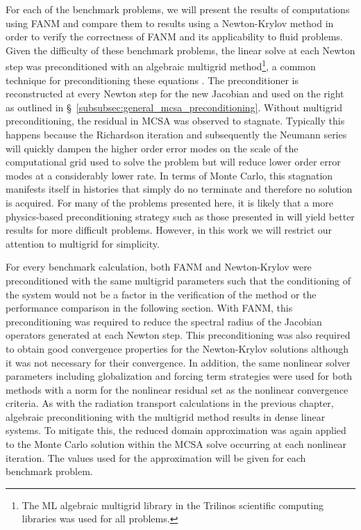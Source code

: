 For each of the benchmark problems, we will present the results of
computations using FANM and compare them to results using a
Newton-Krylov method in order to verify the correctness of FANM and
its applicability to fluid problems. Given the difficulty of these
benchmark problems, the linear solve at each Newton step was
preconditioned with an algebraic multigrid method\footnote{The ML
  algebraic multigrid library in the Trilinos scientific computing
  libraries \cite{heroux_overview_2005} was used for all problems.}, a
common technique for preconditioning these equations
\cite{ghia_high-re_1982,evans_enhanced_2007}. The preconditioner is
reconstructed at every Newton step for the new Jacobian and used on
the right as outlined in
\S~\ref{subsubsec:general_mcsa_preconditioning}. Without multigrid
preconditioning, the residual in MCSA was observed to
stagnate. Typically this happens because the Richardson iteration and
subsequently the Neumann series will quickly dampen the higher order
error modes on the scale of the computational grid used to solve the
problem but will reduce lower order error modes at a considerably
lower rate. In terms of Monte Carlo, this stagnation manifests itself
in histories that simply do no terminate and therefore no solution is
acquired. For many of the problems presented here, it is likely that a
more physics-based preconditioning strategy such as those presented in
\cite{evans_development_2006,evans_enhanced_2007} will yield better
results for more difficult problems. However, in this work we will
restrict our attention to multigrid for simplicity.

For every benchmark calculation, both FANM and Newton-Krylov were
preconditioned with the same multigrid parameters such that the
conditioning of the system would not be a factor in the verification
of the method or the performance comparison in the following
section. With FANM, this preconditioning was required to reduce the
spectral radius of the Jacobian operators generated at each Newton
step. This preconditioning was also required to obtain good
convergence properties for the Newton-Krylov solutions although it was
not necessary for their convergence. In addition, the same nonlinear
solver parameters including globalization and forcing term strategies
were used for both methods with a  norm for the nonlinear
residual set as the nonlinear convergence criteria. As with the
radiation transport calculations in the previous chapter, algebraic
preconditioning with the multigrid method results in dense linear
systems. To mitigate this, the reduced domain approximation was again
applied to the Monte Carlo solution within the MCSA solve occurring at
each nonlinear iteration. The values used for the approximation will
be given for each benchmark problem.


